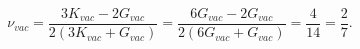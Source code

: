 \[
\nu_{vac} = \frac{3 K_{vac} - 2 G_{vac}}{2 (3 K_{vac} + G_{vac})} = \frac{6 G_{vac} - 2 G_{vac}}{2 (6 G_{vac} + G_{vac})} = \frac{4}{14} = \frac{2}{7}.
\]

